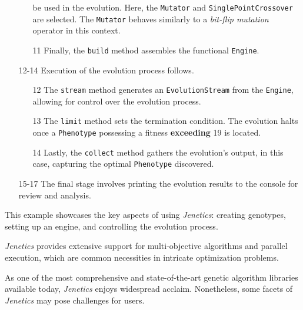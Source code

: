 \begin{enumerate}
\begin{enumerate}
          be used in the evolution.
          Here, the \texttt{Mutator} and \texttt{SinglePointCrossover} are 
          selected.
          The \texttt{Mutator} behaves similarly to a \textit{bit-flip 
          mutation} operator in this context.
        \item[11] Finally, the \texttt{build} method assembles the functional 
          \texttt{Engine}.
      \end{enumerate}
    \item[12-14] Execution of the evolution process follows.
      \begin{enumerate}
        \item[12] The \texttt{stream} method generates an 
          \texttt{EvolutionStream} from the \texttt{Engine}, allowing for 
          control over the evolution process.
        \item[13] The \texttt{limit} method sets the termination condition.
          The evolution halts once a \texttt{Phenotype} possessing a fitness 
          \textbf{exceeding} 19 is located.
        \item[14] Lastly, the \texttt{collect} method gathers the evolution's 
          output, in this case, capturing the optimal \texttt{Phenotype} 
          discovered.
      \end{enumerate}
    \item[15-17] The final stage involves printing the evolution results to the 
      console for review and analysis.
  \end{enumerate}

  This example showcases the key aspects of using \textit{Jenetics}: creating 
  genotypes, setting up an engine, and controlling the evolution process.

  \textit{Jenetics} provides extensive support for multi-objective algorithms 
  and parallel execution, which are common necessities in intricate optimization
  problems.

  As one of the most comprehensive and state-of-the-art genetic algorithm
  libraries available today, \textit{Jenetics} enjoys widespread acclaim.
  Nonetheless, some facets of \textit{Jenetics} may pose challenges for users.

